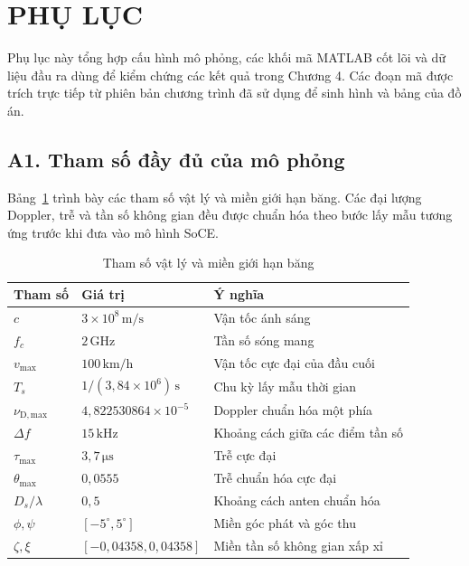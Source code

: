 \cleardoublepage
{}
\section*{\centering PHỤ LỤC}
\label{app:simulation_materials}
\setcounter{table}{0}
\renewcommand{\thetable}{A.\arabic{table}}
\setcounter{lstlisting}{0}
\renewcommand{\thelstlisting}{A.\arabic{lstlisting}}

Phụ lục này tổng hợp cấu hình mô phỏng, các khối mã MATLAB cốt lõi và dữ liệu đầu ra dùng để kiểm chứng các kết quả trong Chương 4. Các đoạn mã được trích trực tiếp từ phiên bản chương trình đã sử dụng để sinh hình và bảng của đồ án.

\subsection*{A1. Tham số đầy đủ của mô phỏng}
{}
\label{app:parameters}

Bảng~\ref{tab:app_physical_parameters} trình bày các tham số vật lý và miền giới hạn băng. Các đại lượng Doppler, trễ và tần số không gian đều được chuẩn hóa theo bước lấy mẫu tương ứng trước khi đưa vào mô hình SoCE.

\begin{table}[H]
    \centering
    \small
    \caption{Tham số vật lý và miền giới hạn băng}
    \label{tab:app_physical_parameters}
    \begin{tabularx}{\textwidth}{l l X}
        \toprule
        Tham số & Giá trị & Ý nghĩa \\
        \midrule
        \(c\) & \(3\times10^8\,\mathrm{m/s}\) & Vận tốc ánh sáng \\
        \(f_c\) & \(2\,\mathrm{GHz}\) & Tần số sóng mang \\
        \(v_{\max}\) & \(100\,\mathrm{km/h}\) & Vận tốc cực đại của đầu cuối \\
        \(T_s\) & \(1/(3{,}84\times10^6)\,\mathrm{s}\) & Chu kỳ lấy mẫu thời gian \\
        \(\nu_{\mathrm{D,max}}\) & \(4{,}822530864\times10^{-5}\) & Doppler chuẩn hóa một phía \\
        \(\Delta f\) & \(15\,\mathrm{kHz}\) & Khoảng cách giữa các điểm tần số \\
        \(\tau_{\max}\) & \(3{,}7\,\mathrm{\mu s}\) & Trễ cực đại \\
        \(\theta_{\max}\) & \(0{,}0555\) & Trễ chuẩn hóa cực đại \\
        \(D_s/\lambda\) & \(0{,}5\) & Khoảng cách anten chuẩn hóa \\
        \(\phi,\psi\) & \([-5^\circ,5^\circ]\) & Miền góc phát và góc thu \\
        \(\zeta,\xi\) & \([-0{,}04358,0{,}04358]\) & Miền tần số không gian xấp xỉ \\
        \bottomrule
    \end{tabularx}
\end{table}

